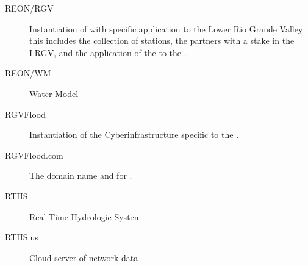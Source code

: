\documentclass[letterpaper,12pt,english]{book}
\begin{document}
\begin{description}
\item[{REON/RGV\label{\detokenize{glossary:term-REON-RGV}}}] \leavevmode
\sphinxAtStartPar
Instantiation of {\hyperref[\detokenize{glossary:term-REON}]{}} with specific application to the Lower Rio Grande Valley \sphinxhyphen{} this includes the collection of {\hyperref[\detokenize{glossary:term-RTHS}]{}} stations, the {\hyperref[\detokenize{glossary:term-REON}]{}} partners with a stake in the LRGV, and the application of the {\hyperref[\detokenize{glossary:term-REON-WM}]{}} to the {\hyperref[\detokenize{glossary:term-LRGV}]{}}.

\item[{REON/WM\label{\detokenize{glossary:term-REON-WM}}}] \leavevmode
\sphinxAtStartPar
{\hyperref[\detokenize{glossary:term-REON}]{}} Water Model

\item[{RGVFlood\label{\detokenize{glossary:term-RGVFlood}}}] \leavevmode
\sphinxAtStartPar
Instantiation of the {\hyperref[\detokenize{glossary:term-REON}]{}} Cyberinfrastructure specific to the {\hyperref[\detokenize{glossary:term-LRGV}]{}}.

\item[{RGVFlood.com\label{\detokenize{glossary:term-RGVFlood.com}}}] \leavevmode
\sphinxAtStartPar
The domain name and {\hyperref[\detokenize{glossary:term-URL}]{}} for {\hyperref[\detokenize{glossary:term-RGVFlood}]{}}.

\item[{RTHS\label{\detokenize{glossary:term-RTHS}}}] \leavevmode
\sphinxAtStartPar
Real Time Hydrologic System

\item[{RTHS.us\label{\detokenize{glossary:term-RTHS.us}}}] \leavevmode
\sphinxAtStartPar
Cloud server of {\hyperref[\detokenize{glossary:term-RTHS}]{}} network data


\end{description}
\end{document}
